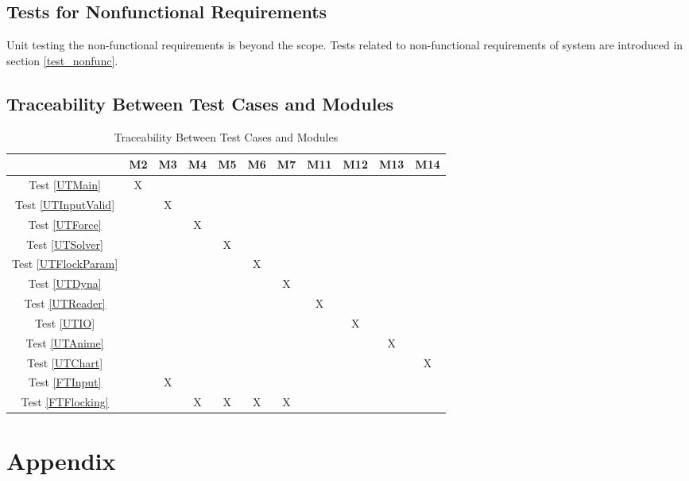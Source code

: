 \documentclass[12pt, titlepage]{article}
\begin{document}
\subsection{Tests for Nonfunctional Requirements}

Unit testing the non-functional requirements is beyond the scope. Tests
related to non-functional requirements of system are introduced in 
section \ref{test_nonfunc}.

\subsection{Traceability Between Test Cases and Modules}

\begin{table}[h!]
\caption{Traceability Between Test Cases and Modules} \label{tblTraceToModule} 
\centering
\begin{tabular}{|c|c|c|c|c|c|c|c|c|c|c|}
\hline
	& M2 & M3 & M4 & M5 & M6 & M7 & M11 & M12 & M13 & M14 \\
\hline
Test \ref{UTMain}           &X& & & & & & & & &\\ \hline
Test \ref{UTInputValid}     & &X& & & & & & & &\\ \hline
Test \ref{UTForce}          & & &X& & & & & & &\\ \hline
Test \ref{UTSolver}         & & & &X& & & & & &\\ \hline
Test \ref{UTFlockParam}     & & & & &X& & & & &\\ \hline
Test \ref{UTDyna}           & & & & & &X& & & &\\ \hline
Test \ref{UTReader}         & & & & & & &X& & &\\ \hline
Test \ref{UTIO}             & & & & & & & &X& &\\ \hline
Test \ref{UTAnime}          & & & & & & & & &X&\\ \hline
Test \ref{UTChart}          & & & & & & & & & &X\\ \hline
Test \ref{FTInput}          & &X& & & & & & & &\\ \hline
Test \ref{FTFlocking}       & & &X&X&X&X& & & &\\ \hline
\end{tabular}
\end{table}
				




\newpage

\section{Appendix}
\end{document}
